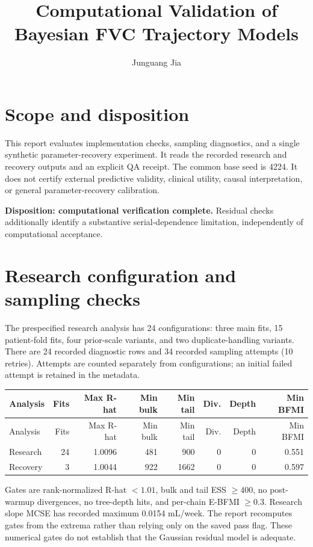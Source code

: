 \documentclass[11pt,letterpaper]{article}
\title{Computational Validation of Bayesian FVC Trajectory Models}
\author{Junguang Jia}
\date{}
\begin{document}
\maketitle
\section{Scope and disposition}
This report evaluates implementation checks, sampling diagnostics, and a single synthetic parameter-recovery experiment. It reads the recorded research and recovery outputs and an explicit QA receipt. The common base seed is 4224. It does not certify external predictive validity, clinical utility, causal interpretation, or general parameter-recovery calibration.

\textbf{Disposition: computational verification complete.} Residual checks additionally identify a substantive serial-dependence limitation, independently of computational acceptance.

\section{Research configuration and sampling checks}
The prespecified research analysis has 24 configurations: three main fits, 15 patient-fold fits, four prior-scale variants, and two duplicate-handling variants. There are 24 recorded diagnostic rows and 34 recorded sampling attempts (10 retries). Attempts are counted separately from configurations; an initial failed attempt is retained in the metadata.

\begingroup\small\setlength{\tabcolsep}{5pt}\begin{longtable}{lrrrrrrr}\toprule
Analysis & Fits & Max R-hat & Min bulk & Min tail & Div. & Depth & Min BFMI \\
\midrule\endfirsthead\toprule
Analysis & Fits & Max R-hat & Min bulk & Min tail & Div. & Depth & Min BFMI \\
\midrule\endhead\bottomrule\endfoot
Research & 24 & 1.0096 & 481 & 900 & 0 & 0 & 0.551 \\
Recovery & 3 & 1.0044 & 922 & 1662 & 0 & 0 & 0.597 \\
\end{longtable}\endgroup
Gates are rank-normalized R-hat $<1.01$, bulk and tail ESS $\geq400$, no post-warmup divergences, no tree-depth hits, and per-chain E-BFMI $\geq0.3$. Research slope MCSE has recorded maximum 0.0154 mL/week. The report recomputes gates from the extrema rather than relying only on the saved pass flag. These numerical gates do not establish that the Gaussian residual model is adequate.
\end{document}
